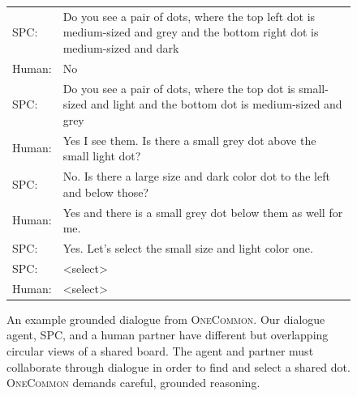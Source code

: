 \documentclass[11pt]{article}
\newcommand{\system}{SPC}
\begin{document}
\begin{figure}[!t]
\vspace{1em}
\small
\begin{tabular}[b]{lp{}} %
\toprule
{\color{red} SPC}:\;&Do you see a pair of dots, where the top left dot is medium-sized and grey and the bottom right dot is medium-sized and dark \\
{\color{blue} Human}:\;&No \\
{\color{red} SPC}:\;&Do you see a pair of dots, where the top dot is small-sized and light and the bottom dot is medium-sized and grey \\
{\color{blue} Human}:\;&Yes I see them. Is there a small grey dot above the small light dot? \\
{\color{red} SPC}:\;&No. Is there a large size and dark color dot to the left and below those? \\
{\color{blue} Human}:\;&Yes and there is a small grey dot below them as well for me. \\
{\color{red} SPC}:\;&Yes. Let's select the small size and light color one. \\
{\color{red} \system{}}:\;&<select> \\ %
{\color{blue} Human}:\;&<select> \\ %
\bottomrule
\end{tabular}

\vspace{1em}

\caption{
An example grounded dialogue from \textsc{OneCommon}. Our dialogue agent, {\color{red}SPC}, and a human {\color{blue}partner} have different but overlapping circular views of a shared board.
The agent and partner must collaborate through dialogue in order to find and
select a shared dot.
\textsc{OneCommon} demands careful, grounded reasoning.
\vspace{-.8em}
}
\label{fig:oc}
\end{figure}
\end{document}
